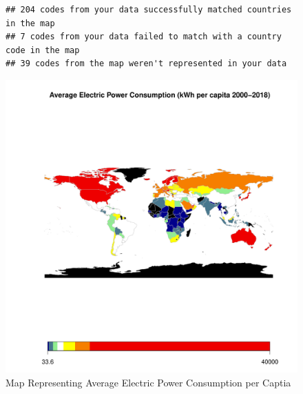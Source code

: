 \documentclass{article}\usepackage[]{graphicx}\usepackage[]{xcolor}
\makeatletter
\def\maxwidth{ %
  \ifdim\Gin@nat@width>\linewidth
    \linewidth
  \else
    \Gin@nat@width
  \fi
}
\newenvironment{kframe}{%
 \def\at@end@of@kframe{}%
 \ifinner\ifhmode%
  \def\at@end@of@kframe{\end{minipage}}%
  \begin{minipage}{\columnwidth}%
 \fi\fi%
 \def\FrameCommand##1{\hskip\@totalleftmargin \hskip-\fboxsep
 \colorbox{shadecolor}{##1}\hskip-\fboxsep
     \hskip-\linewidth \hskip-\@totalleftmargin \hskip\columnwidth}%
 \MakeFramed {\advance\hsize-\width
   \@totalleftmargin\z@ \linewidth\hsize
   \@setminipage}}%
 {\par\unskip\endMakeFramed%
 \at@end@of@kframe}
\newenvironment{knitrout}{}{} %
\makeatother
\begin{document}
\newpage
\begin{figure}[h!]
\centering
\begin{knitrout}
\color{fgcolor}\begin{kframe}
\begin{verbatim}
## 204 codes from your data successfully matched countries in the map
## 7 codes from your data failed to match with a country code in the map
## 39 codes from the map weren't represented in your data
\end{verbatim}
\end{kframe}
\includegraphics[width=\maxwidth]{figure/unnamed-chunk-18-1} 
\end{knitrout}
\caption{Map Representing Average Electric Power Consumption per Captia }

\label{fig}
\end{figure}

\newpage
\end{document}
